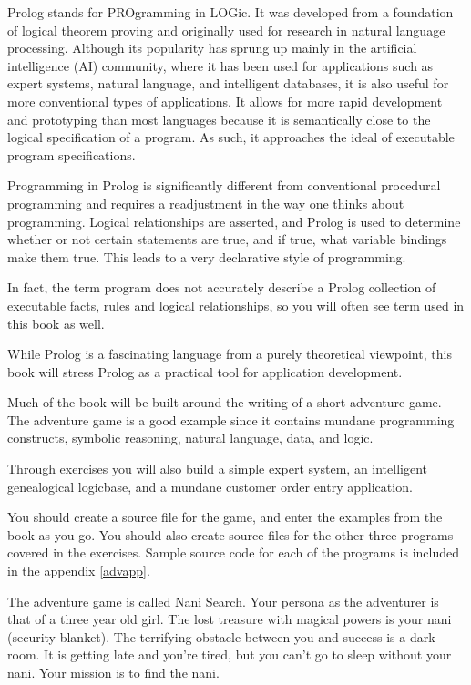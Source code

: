 \secdown

Prolog stands for PROgramming in LOGic. It was developed from a foundation of
logical theorem proving and originally used for research in natural language
processing. Although its popularity has sprung up mainly in the artificial
intelligence (AI) community, where it has been used for applications such as
expert systems, natural language, and intelligent databases, it is also useful
for more conventional types of applications. It allows for more rapid
development and prototyping than most languages because it is semantically close
to the logical specification of a program. As such, it approaches the ideal of
executable program specifications.

Programming in Prolog is significantly different from conventional procedural
programming and requires a readjustment in the way one thinks about programming.
Logical relationships are asserted, and Prolog is used to determine whether or
not certain statements are true, and if true, what variable bindings make them
true. This leads to a very declarative style of programming.

In fact, the term program does not accurately describe a Prolog collection of
executable facts, rules and logical relationships, so you will often see term
 used in this book as well.

While Prolog is a fascinating language from a purely theoretical viewpoint, this
book will stress Prolog as a practical tool for application development.

Much of the book will be built around the writing of a short adventure game. The
adventure game is a good example since it contains mundane programming
constructs, symbolic reasoning, natural language, data, and logic.

Through exercises you will also build a simple expert system, an intelligent
genealogical logicbase, and a mundane customer order entry application.

You should create a source file for the game, and enter the examples from the
book as you go. You should also create source files for the other three programs
covered in the exercises. Sample source code for each of the programs is
included in the appendix \ref{advapp}.

The adventure game is called Nani Search. Your persona as the adventurer is that
of a three year old girl. The lost treasure with magical powers is your nani
(security blanket). The terrifying obstacle between you and success is a dark
room. It is getting late and you're tired, but you can't go to sleep without
your nani. Your mission is to find the nani.

